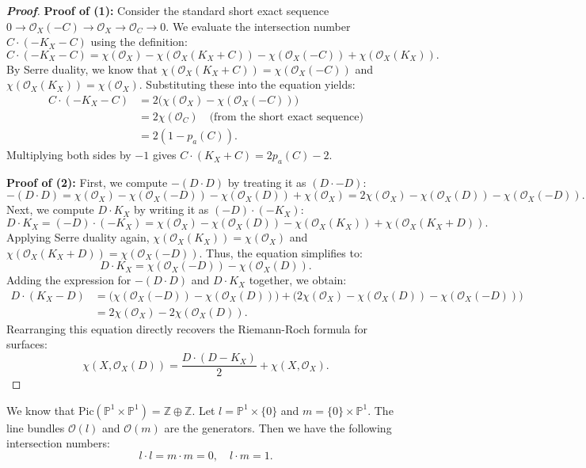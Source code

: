 \begin{proof}[\textbf{Proof}]
\textbf{Proof of (1):} 
Consider the standard short exact sequence $0 \to \mathcal{O}_X(-C) \to \mathcal{O}_X \to \mathcal{O}_C \to 0$. We evaluate the intersection number $C \cdot (-K_X - C)$ using the definition:
\[
C \cdot (-K_X - C) = \chi(\mathcal{O}_X) - \chi(\mathcal{O}_X(K_X + C)) - \chi(\mathcal{O}_X(-C)) + \chi(\mathcal{O}_X(K_X)).
\]
By Serre duality, we know that $\chi(\mathcal{O}_X(K_X + C)) = \chi(\mathcal{O}_X(-C))$ and $\chi(\mathcal{O}_X(K_X)) = \chi(\mathcal{O}_X)$. Substituting these into the equation yields:
\begin{align*}
C \cdot (-K_X - C) &= 2 \big( \chi(\mathcal{O}_X) - \chi(\mathcal{O}_X(-C)) \big) \\
&= 2 \chi(\mathcal{O}_C) \quad \text{(from the short exact sequence)} \\
&= 2(1 - p_a(C)).
\end{align*}
Multiplying both sides by $-1$ gives $C \cdot (K_X + C) = 2p_a(C) - 2$.



\textbf{Proof of (2):}
First, we compute $-(D \cdot D)$ by treating it as $(D \cdot -D)$:
\[
-(D \cdot D) = \chi(\mathcal{O}_X) - \chi(\mathcal{O}_X(-D)) - \chi(\mathcal{O}_X(D)) + \chi(\mathcal{O}_X) = 2\chi(\mathcal{O}_X) - \chi(\mathcal{O}_X(D)) - \chi(\mathcal{O}_X(-D)).
\]
Next, we compute $D \cdot K_X$ by writing it as $(-D) \cdot (-K_X)$:
\[
D \cdot K_X = (-D) \cdot (-K_X) = \chi(\mathcal{O}_X) - \chi(\mathcal{O}_X(D)) - \chi(\mathcal{O}_X(K_X)) + \chi(\mathcal{O}_X(K_X + D)).
\]
Applying Serre duality again, $\chi(\mathcal{O}_X(K_X)) = \chi(\mathcal{O}_X)$ and $\chi(\mathcal{O}_X(K_X + D)) = \chi(\mathcal{O}_X(-D))$. Thus, the equation simplifies to:
\[
D \cdot K_X = \chi(\mathcal{O}_X(-D)) - \chi(\mathcal{O}_X(D)).
\]
Adding the expression for $-(D \cdot D)$ and $D \cdot K_X$ together, we obtain:
\begin{align*}
D \cdot (K_X - D) &= \big( \chi(\mathcal{O}_X(-D)) - \chi(\mathcal{O}_X(D)) \big) + \big( 2\chi(\mathcal{O}_X) - \chi(\mathcal{O}_X(D)) - \chi(\mathcal{O}_X(-D)) \big) \\
&= 2\chi(\mathcal{O}_X) - 2\chi(\mathcal{O}_X(D)).
\end{align*}
Rearranging this equation directly recovers the Riemann-Roch formula for surfaces:
\[
\chi(X, \mathcal{O}_X(D)) = \frac{D \cdot (D - K_X)}{2} + \chi(X, \mathcal{O}_X).
\]
\end{proof}

\begin{theorem}[20.2.C]
We know that $\text{Pic}(\mathbb{P}^1 \times \mathbb{P}^1) = \mathbb{Z} \oplus \mathbb{Z}$. Let $l = \mathbb{P}^1 \times \{0\}$ and $m = \{0\} \times \mathbb{P}^1$. The line bundles $\mathcal{O}(l)$ and $\mathcal{O}(m)$ are the generators. Then we have the following intersection numbers:
\[
l \cdot l = m \cdot m = 0, \quad l \cdot m = 1.
\]
\end{theorem}

